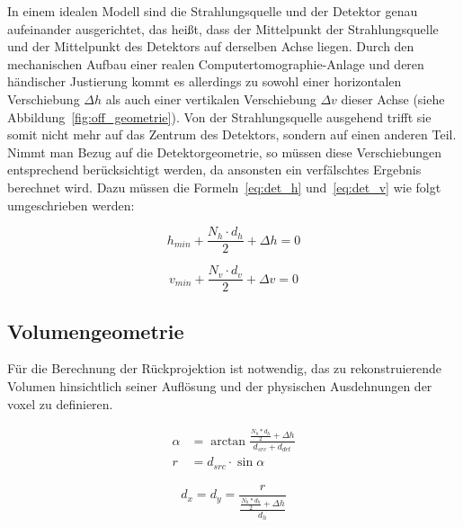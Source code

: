 In einem idealen Modell sind die Strahlungsquelle und der Detektor genau aufeinander ausgerichtet, das heißt, dass der
Mittelpunkt der Strahlungsquelle und der Mittelpunkt des Detektors auf derselben Achse liegen. Durch den mechanischen
Aufbau einer realen Computertomographie-Anlage und deren händischer Justierung kommt es allerdings zu sowohl
einer horizontalen Verschiebung $\Delta h$ als auch einer vertikalen Verschiebung $\Delta v$ dieser Achse (siehe
Abbildung~\ref{fig:off_geometrie}). Von der Strahlungsquelle ausgehend trifft sie somit nicht mehr auf das Zentrum des
Detektors, sondern auf einen anderen Teil. Nimmt man Bezug auf die Detektorgeometrie, so müssen diese Verschiebungen
entsprechend berücksichtigt werden, da ansonsten ein verfälschtes Ergebnis berechnet wird. Dazu müssen die
Formeln~\ref{eq:det_h} und~\ref{eq:det_v} wie folgt umgeschrieben werden:

\begin{equation} 
    h_{min} + \frac{N_h \cdot d_h}{2} + \Delta h = 0
\end{equation}

\begin{equation}
    v_{min} + \frac{N_v \cdot d_v}{2}  + \Delta v = 0
\end{equation}

\subsection{Volumengeometrie}\label{ssec:geometrie}

Für die Berechnung der Rückprojektion ist notwendig, das zu rekonstruierende Volumen hinsichtlich seiner Auflösung und
der physischen Ausdehnungen der \gls{voxel} zu definieren.

\begin{equation}
    \begin{aligned}
        \alpha &= \arctan\frac{\frac{N_h * d_h}{2} + \Delta h}{d_{src} + d_{det}}\\
        r &= d_{src} \cdot \sin \alpha
    \end{aligned}
\end{equation}

\begin{equation}
    d_x = d_y = \frac{r}{\frac{\frac{N_h * d_h}{2} + \Delta h}{d_h}}
\end{equation}

